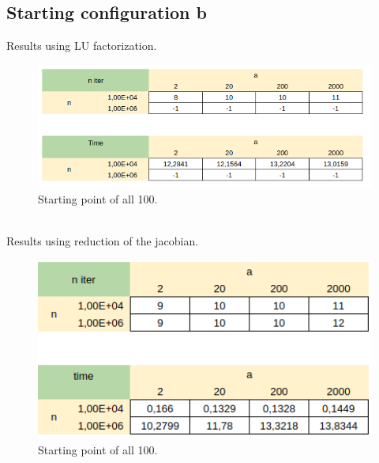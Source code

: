\documentclass[]{article}
\begin{document}
\subsection{Starting configuration b}
Results using LU factorization.\\
\begin{figure}[h]
	\includegraphics[width=12cm]{table6.png}
	\caption{Starting point of all 100.}
\end{figure}\\
Results using reduction of the jacobian.
\begin{figure}[h]
	\includegraphics[width=12cm]{table3.png}
	\caption{Starting point of all 100.}
\end{figure}
\pagebreak
\end{document}
